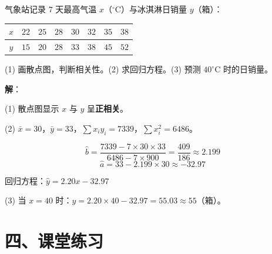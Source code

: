 \documentclass[12pt, a4paper]{ctexart}
\begin{document}
\begin{appbox}[【应用3】气温与冰淇淋销量回归]
气象站记录 $7$ 天最高气温 $x$（$^{\circ}$C）与冰淇淋日销量 $y$（箱）：

\begin{center}
\begin{tabular}{cccccccc}
\toprule
$x$ & $22$ & $25$ & $28$ & $30$ & $32$ & $35$ & $38$ \\
\midrule
$y$ & $15$ & $20$ & $28$ & $33$ & $38$ & $45$ & $52$ \\
\bottomrule
\end{tabular}
\end{center}

(1) 画散点图，判断相关性。(2) 求回归方程。(3) 预测 $40^{\circ}$C 时的日销量。
\end{appbox}

\textbf{解}：

(1) 散点图显示 $x$ 与 $y$ 呈\textbf{正相关}。

\begin{center}
\end{center}

(2) $\bar{x} = 30$，$\bar{y} = 33$，$\sum x_i y_i = 7339$，$\sum x_i^2 = 6486$。

\[
\hat{b} = \frac{7339 - 7\times30\times33}{6486 - 7\times900} = \frac{409}{186} \approx 2.199
\]
\[
\hat{a} = 33 - 2.199\times30 \approx -32.97
\]

回归方程：$\hat{y} = 2.20x - 32.97$

(3) 当 $x = 40$ 时：$\hat{y} = 2.20\times40 - 32.97 = 55.03 \approx 55$（箱）。

\section*{\textcolor{tipgreen}{四、课堂练习}}
\end{document}

